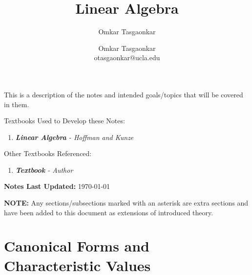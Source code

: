 \documentclass[10pt,letterpaper]{article} %
\author{Omkar Tasgaonkar}
\title{Linear Algebra}
\author{Omkar Tasgaonkar \\ \small otasgaonkar@ucla.edu}
\date{}
\begin{document}
\maketitle
This is a description of the notes and intended goals/topics that will be covered in them.

\begin{tcolorbox}[colback=white, colframe=black, arc=0mm]
Textbooks Used to Develop these Notes:
\begin{enumerate}
\item \textit{\textbf{Linear Algebra} - Hoffman and Kunze}
\end{enumerate}
Other Textbooks Referenced:
\begin{enumerate}
\item \textit{\textbf{Textbook} - Author}
\end{enumerate}
\end{tcolorbox}
\begin{tcolorbox}[colback=white, colframe=black, arc=0mm]
\textbf{Notes Last Updated:} \today
\end{tcolorbox}
\thispagestyle{firstpage}
\newpage
\begin{tcolorbox}[colback=white, colframe=black, arc=0mm]
\tableofcontents
\end{tcolorbox}
\textbf{NOTE:} Any sections/subsections marked with an asterisk are extra sections and have been added to this document as extensions of introduced theory.
\pagebreak


\section{Canonical Forms and Characteristic Values}
\end{document}
